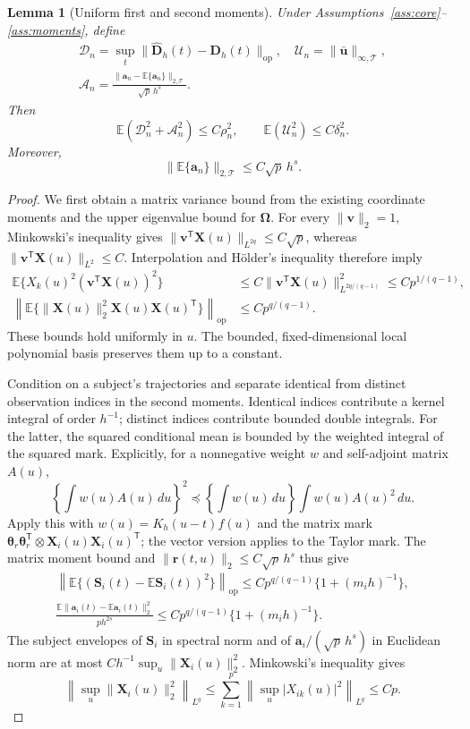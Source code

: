 \documentclass[12pt]{article}
\newtheorem{lemma}{Lemma}
\newcommand{\ba}{{\mathbf a}}
\newcommand{\br}{{\mathbf r}}
\newcommand{\bu}{{\mathbf u}}
\newcommand{\bv}{{\mathbf v}}
\newcommand{\bD}{{\mathbf D}}
\newcommand{\bS}{{\mathbf S}}
\newcommand{\bX}{{\mathbf X}}
\newcommand{\btheta}  {\boldsymbol{\theta}}
\newcommand{\bOmega} {\boldsymbol{\Omega}}
\newcommand{\expect}{\mathbb{E}}
\newcommand{\trans}{{\scriptscriptstyle\mathsf{T}}}
\numberwithin{equation}{section}
\begin{document}
\begin{lemma}[Uniform first and second moments]
\label{lem:hd-concentration}
Under Assumptions~\ref{ass:core}--\ref{ass:moments}, define
\[
\begin{gathered}
\mathcal D_n=\sup_t\|\widehat{\bD}_h(t)-\bD_h(t)\|_{\mathrm{op}},\quad
\mathcal U_n=\|\bar\bu\|_{\infty,\mathcal T},\\
\mathcal A_n=\frac{\|\ba_n-\expect\{\ba_n\}\|_{2,\mathcal T}}
{\sqrt p\,h^s}.
\end{gathered}
\]
Then
\[
\expect(\mathcal D_n^2+\mathcal A_n^2)\le C\rho_n^2,
\qquad \expect(\mathcal U_n^2)\le C\delta_n^2.
\]
Moreover,
\[
\|\expect\{\ba_n\}\|_{2,\mathcal T}\le C\sqrt p\,h^s.
\]
\end{lemma}

\begin{proof}
We first obtain a matrix variance bound from the existing coordinate
moments and the upper eigenvalue bound for $\bOmega$. For every
$\|\bv\|_2=1$, Minkowski's inequality gives
$\|\bv^\trans\bX(u)\|_{L^{2q}}\le C\sqrt p$, whereas
$\|\bv^\trans\bX(u)\|_{L^2}\le C$. Interpolation and H\"older's
inequality therefore imply
\[
\begin{split}
\expect\{X_k(u)^2(\bv^\trans\bX(u))^2\}
&\le C\|\bv^\trans\bX(u)\|_{L^{2q/(q-1)}}^2
\le Cp^{1/(q-1)},\\
\left\|\expect\{\|\bX(u)\|_2^2\bX(u)\bX(u)^\trans\}
\right\|_{\mathrm{op}}&\le Cp^{q/(q-1)}.
\end{split}
\]
These bounds hold uniformly in $u$. The bounded, fixed-dimensional
local polynomial basis preserves them up to a constant.

Condition on a subject's trajectories and separate identical from
distinct observation indices in the second moments. Identical indices
contribute a kernel integral of order $h^{-1}$; distinct indices
contribute bounded double integrals. For the latter, the squared
conditional mean is bounded by the weighted integral of the squared
mark. Explicitly, for a nonnegative weight $w$ and self-adjoint
matrix $A(u)$,
\[
\left\{\int w(u)A(u)\,du\right\}^2
\preceq\left\{\int w(u)\,du\right\}
\int w(u)A(u)^2\,du.
\]
Apply this with $w(u)=K_h(u-t)f(u)$ and the matrix mark
$\btheta_r\btheta_r^\trans\otimes\bX_i(u)\bX_i(u)^\trans$;
the vector version applies to the Taylor mark.
The matrix moment bound and
$\|\br(t,u)\|_2\le C\sqrt p\,h^s$ thus give
\[
\begin{gathered}
\left\|\expect\{(\bS_i(t)-\expect\bS_i(t))^2\}
\right\|_{\mathrm{op}}
\le Cp^{q/(q-1)}\{1+(m_i h)^{-1}\},\\
\frac{\expect\|\ba_i(t)-\expect\ba_i(t)\|_2^2}{p h^{2s}}
\le Cp^{q/(q-1)}\{1+(m_i h)^{-1}\}.
\end{gathered}
\]
The subject envelopes of $\bS_i$ in spectral norm and of
$\ba_i/(\sqrt p\,h^s)$ in Euclidean norm are at most
$Ch^{-1}\sup_u\|\bX_i(u)\|_2^2$. Minkowski's inequality gives
\[
\left\|\sup_u\|\bX_i(u)\|_2^2\right\|_{L^q}
\le\sum_{k=1}^p\left\|\sup_u|X_{ik}(u)|^2\right\|_{L^q}
\le Cp.
\]


\end{proof}
\end{document}
